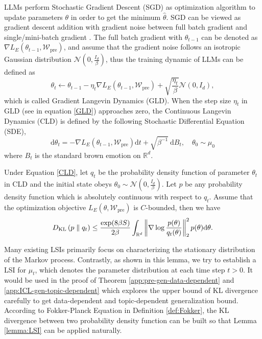 \begin{definition} \label{def:GLD-CLD}
	LLMs perform Stochastic Gradient Descent (SGD) as optimization algorithm to update parameters $\theta$ in order to get the minimum $\hat{\theta}$. SGD can be viewed as gradient descent addition with gradient noise between full batch gradient and single/mini-batch gradient \citep{wang2022two}. The full batch gradient with $\theta_{t-1}$ can be denoted as $\nabla L_{E}(\theta_{t-1}, \mathcal{W}_{\text{pre}})$, and assume that the gradient noise follows an isotropic Gaussian distribution $\mathcal{N}(0,\frac{I_d}{\beta})$, thus the training dynamic of LLMs can be defined as
	\begin{equation}\label{GLD}
		\theta_t \leftarrow {\theta}_{t-1} - \eta_t \nabla L_{E}(\theta_{t-1}, \mathcal{W}_{\text{pre}})+\sqrt{\frac{\eta_t}{\beta}}\mathcal{N}(0,I_d),
	\end{equation}
	which is called Gradient Langevin Dynamics (GLD). When the step size $\eta_t$ in GLD (see in equation \ref{GLD}) approaches zero, the Continuous Langevin Dynamics (CLD) is defined by the following Stochastic Differential Equation (SDE),
	\begin{equation}\label{CLD}
		\mathrm{d} \theta_t=-\nabla L_{E}(\theta_{t-1}, \mathcal{W}_{\text{pre}})\mathrm{d} t+\sqrt{\beta^{-1}} \mathrm{~d} B_t, \quad \theta_0 \sim \mu_0
	\end{equation}
	where $B_t$ is the standard brown emotion on $\mathbb{R}^d$. 
\end{definition}

\begin{lemma}\label{lemma:LSI}
	Under Equation \ref{CLD}, let $q_t$ be the probability density function of parameter $\theta_t$ in CLD and the initial state obeys $\theta_0 \sim \mathcal{N}(0,\frac{I_d}{\beta})$. Let $p$ be any probability density function which is absolutely continuous with respect to $q_t$. Assume that the optimization objective $L_E(\theta,\mathcal{W}_{\text{pre}})$ is $C$-bounded, then we have
	$$
	D_{\mathrm{KL}}\left(p \parallel q_t\right)\leq\frac{\exp(8\beta S)}{2\beta}\int_{\mathbb{R}^d}\left\|\nabla\log\frac{p(\theta)}{q_t(\theta)}\right\|^2_2 p(\theta)\mathrm{d}\theta.
	$$
\end{lemma}

Many existing LSIs primarily focus on characterizing the stationary distribution of the Markov process. Contrastly, as shown in this lemma, we try to establish a LSI for  $\mu_t$, which denotes the parameter distribution at each time step $t>0$. It would be used in the proof of Theorem \ref{app:pre-gen-data-dependent} and \ref{app:ICL-gen-topic-dependent} which explores the upper bound of KL divergence carefully to get data-dependent and topic-dependent generalization bound. According to Fokker-Planck Equation in Definition \ref{def:Fokker}, the KL divergence between two probability density function can be built so that Lemma \ref{lemma:LSI} can be applied naturally.

